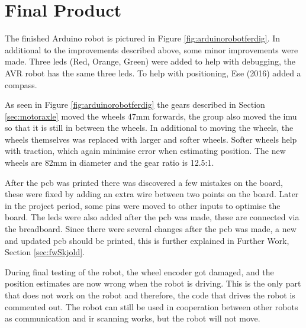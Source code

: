 \section{Final Product}
The finished Arduino robot is pictured in Figure \ref{fig:arduinorobotferdig}. In additional to the improvements described above, some minor improvements were made. Three \acrshort{led}s (Red, Orange, Green) were added to help with debugging, the AVR robot has the same three \acrshort{led}s. To help with positioning, Ese (2016) added a compass.

As seen in Figure \ref{fig:arduinorobotferdig} the gears described in Section \ref{sec:motoraxle} moved the wheels 47mm forwards, the group also moved the \acrshort{imu} so that it is still in between the wheels. In additional to moving the wheels, the wheels themselves was replaced with larger and softer wheels. Softer wheels help with traction, which again minimise error when estimating position. The new wheels are 82mm in diameter and the gear ratio is 12.5:1.

After the \acrshort{pcb} was printed there was discovered a few mistakes on the board, these were fixed by adding an extra wire between two points on the board. Later in the project period, some pins were moved to other inputs to optimise the board. The \acrshort{led}s were also added after the \acrshort{pcb} was made, these are connected via the breadboard. Since there were several changes after the \acrshort{pcb} was made, a new and updated \acrshort{pcb} should be printed, this is further explained in Further Work, Section \ref{sec:fwSkjold}.

During final testing of the robot, the wheel encoder got damaged, and the position estimates are now wrong when the robot is driving. This is the only part that does not work on the robot and therefore, the code that drives the robot is commented out. The robot can still be used in cooperation between other robots as communication and \acrshort{ir} scanning works, but the robot will not move.
\vspace*{20pt}
